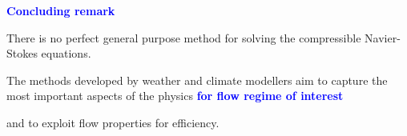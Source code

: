 \documentclass[a4]{seminar}
\newcommand{\B}[1]{\textcolor{blue}{#1}}
\begin{document}

\begin{slide}

\B{\bf Concluding remark}

\vspace{2mm}

There is no perfect general purpose method for solving the compressible
Navier-Stokes equations.

The methods developed by weather and climate modellers
aim to capture the most important aspects of the physics
\B{\bf for flow regime of interest}

and to exploit flow properties for efficiency.

\end{slide}





\end{document}
